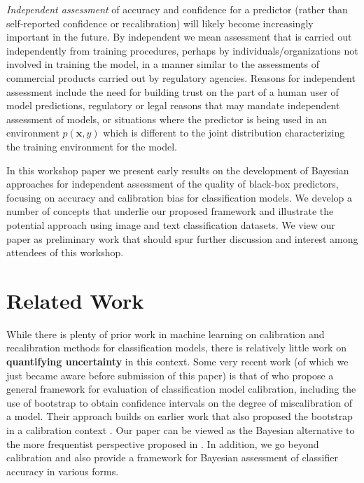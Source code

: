 \documentclass{article}
\newcommand{\ux}{{\mathbf{x}}}
\newcommand{\robby}[1]{\textcolor{Red}{[#1]\textsubscript{Robby}}}
\begin{document}
{\it Independent assessment} of accuracy and confidence for a predictor (rather than self-reported confidence or recalibration) will likely become increasingly important in the future. By independent we mean assessment that is carried out independently from training procedures, perhaps by individuals/organizations not involved in training the model, in a manner similar to the assessments of commercial products carried out by  regulatory agencies.
Reasons for independent assessment include the need for  building trust on the part of a human user of model predictions,  regulatory or legal reasons that may mandate independent assessment of models, or situations where the predictor is being used in an environment $p(\ux, y)$ which is different to the joint distribution characterizing the training environment for the model.

In this workshop paper we present early results on the development of Bayesian approaches for independent assessment of the quality of black-box predictors, focusing on accuracy and calibration bias for classification models.
We develop a number of concepts that underlie our proposed framework and illustrate the potential approach using image and text classification datasets.
We view our paper as preliminary work that should spur further discussion and interest among attendees of this workshop.


\section{Related Work}

While there is plenty of prior work in machine learning on calibration and recalibration methods for classification models, there is relatively little work on {\bf quantifying uncertainty} in this context.
Some very recent work (of which we just became aware before submission of this paper) is that of \citet{vaicenavicius19a} who propose a general framework for evaluation of classification model calibration, including the use of bootstrap to obtain confidence intervals on the degree of miscalibration of a model. Their approach builds on earlier work that also proposed the bootstrap in a calibration context \cite{brocker2007increasing}. Our paper can be viewed as the Bayesian alternative to the more frequentist perspective proposed in \citet{vaicenavicius19a}.
In addition, we go beyond calibration and also provide a framework for Bayesian assessment of classifier accuracy in various forms.
\end{document}

